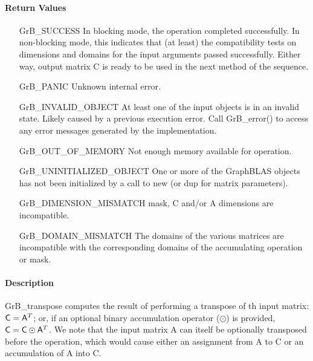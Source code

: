 \paragraph{Return Values}

\begin{itemize}[leftmargin=2.1in]
    \item[{\sf GrB\_SUCCESS}]         In blocking mode, the operation completed
	    successfully. In non-blocking mode, this indicates that (at least) the compatibility 
    tests on dimensions and domains for the input arguments passed successfully. 
    Either way, output matrix {\sf C} is ready to be used in the next method of 
    the sequence.

    \item[{\sf GrB\_PANIC}]            Unknown internal error.
    
    \item[{\sf GrB\_INVALID\_OBJECT}] At least one of the input objects is
	    in an invalid state. Likely caused by a previous execution error.
    Call {\sf GrB\_error()} to access 
    any error messages generated by the implementation.

    \item[{\sf GrB\_OUT\_OF\_MEMORY}]  Not enough memory available for operation.
    
    \item[{\sf GrB\_UNINITIALIZED\_OBJECT}] One or more of the GraphBLAS objects 
    has not been initialized by a call to {\sf new} (or {\sf dup} for matrix
    parameters).
    
    \item[{\sf GrB\_DIMENSION\_MISMATCH}]  {\sf mask}, {\sf C} and/or {\sf A} dimensions are
    incompatible. 
    
    \item[{\sf GrB\_DOMAIN\_MISMATCH}]    The domains of the various matrices are
	incompatible with the corresponding domains of the accumulating operation or mask.
\end{itemize}

\paragraph{Description}

{\sf GrB\_transpose} computes the result of performing
a transpose of th input matrix:
${\sf C} = {\sf A}^T$; 
or, if an optional binary accumulation 
operator ($\odot$) is provided, ${\sf C} = {\sf C} \odot {\sf A}^T$.  
We note that the input matrix {\sf A} can itself be optionally transposed before the operation,
which would cause either an assignment from {\sf A} to {\sf C} or an
accumulation of {\sf A} into {\sf C}.

